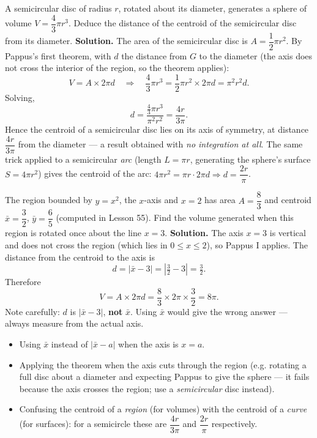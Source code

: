 \documentclass[11pt]{article}
\begin{document}
\begin{exoresolu}
A semicircular disc of radius $r$, rotated about its diameter, generates a sphere of volume $V = \dfrac{4}{3}\pi r^3$. Deduce the distance of the centroid of the semicircular disc from its diameter.
\tcblower
\textbf{Solution.} The area of the semicircular disc is $A = \dfrac{1}{2}\pi r^2$. By Pappus's first theorem, with $d$ the distance from $G$ to the diameter (the axis does not cross the interior of the region, so the theorem applies):
\[ V = A \times 2\pi d
\quad\Longrightarrow\quad
\frac{4}{3}\pi r^3 = \frac{1}{2}\pi r^2 \times 2\pi d = \pi^2 r^2 d. \]
Solving,
\[ d = \frac{\tfrac{4}{3}\pi r^3}{\pi^2 r^2} = \frac{4r}{3\pi}. \]
Hence the centroid of a semicircular disc lies on its axis of symmetry, at distance $\boxed{\dfrac{4r}{3\pi}}$ from the diameter — a result obtained with \emph{no integration at all}. The same trick applied to a semicircular \emph{arc} (length $L = \pi r$, generating the sphere's surface $S = 4\pi r^2$) gives the centroid of the arc: $4\pi r^2 = \pi r \cdot 2\pi d \Rightarrow d = \dfrac{2r}{\pi}$.
\end{exoresolu}

\begin{exoresolu}
The region bounded by $y = x^2$, the $x$-axis and $x = 2$ has area $A = \dfrac{8}{3}$ and centroid $\bar{x} = \dfrac{3}{2}$, $\bar{y} = \dfrac{6}{5}$ (computed in Lesson 55). Find the volume generated when this region is rotated once about the line $x = 3$.
\tcblower
\textbf{Solution.} The axis $x = 3$ is vertical and does not cross the region (which lies in $0 \le x \le 2$), so Pappus I applies. The distance from the centroid to the axis is
\[ d = |\bar{x} - 3| = \left|\tfrac{3}{2} - 3\right| = \tfrac{3}{2}. \]
Therefore
\[ V = A \times 2\pi d = \frac{8}{3} \times 2\pi \times \frac{3}{2} = 8\pi. \]
Note carefully: $d$ is $|\bar{x} - 3|$, \textbf{not} $\bar{x}$. Using $\bar{x}$ would give the wrong answer — always measure from the actual axis.
\end{exoresolu}

\begin{attention}
\begin{itemize}
\item Using $\bar{x}$ instead of $|\bar{x} - a|$ when the axis is $x = a$.
\item Applying the theorem when the axis cuts through the region (e.g. rotating a full disc about a diameter and expecting Pappus to give the sphere — it fails because the axis crosses the region; use a \emph{semicircular} disc instead).
\item Confusing the centroid of a \emph{region} (for volumes) with the centroid of a \emph{curve} (for surfaces): for a semicircle these are $\dfrac{4r}{3\pi}$ and $\dfrac{2r}{\pi}$ respectively.
\end{itemize}
\end{attention}
\end{document}
